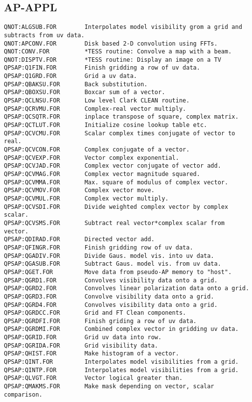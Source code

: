 \subsection{AP-APPL}
\begin{verbatim}
QNOT:ALGSUB.FOR        Interpolates model visibility grom a grid and subtracts from uv data.
QNOT:APCONV.FOR        Disk based 2-D convolution using FFTs.
QNOT:CONV.FOR          *TESS routine: Convolve a map with a beam.
QNOT:DISPTV.FOR        *TESS routine: Display an image on a TV
QPSAP:Q1FIN.FOR        Finish gridding a row of uv data.
QPSAP:Q1GRD.FOR        Grid a uv data.
QPSAP:QBAKSU.FOR       Back substitution.
QPSAP:QBOXSU.FOR       Boxcar sum of a vector.
QPSAP:QCLNSU.FOR       Low level Clark CLEAN routine.
QPSAP:QCRVMU.FOR       Complex-real vector multiply.
QPSAP:QCSQTR.FOR       inplace transpose of square, complex matrix.
QPSAP:QCTLUT.FOR       Initialize cosine lookup table etc.
QPSAP:QCVCMU.FOR       Scalar complex times conjugate of vector to real.
QPSAP:QCVCON.FOR       Complex conjugate of a vector.
QPSAP:QCVEXP.FOR       Vector complex exponential.
QPSAP:QCVJAD.FOR       Complex vector conjugate of vector add.
QPSAP:QCVMAG.FOR       Complex vector magnitude squared.
QPSAP:QCVMMA.FOR       Max. square of modulus of complex vector.
QPSAP:QCVMOV.FOR       Complex vector move.
QPSAP:QCVMUL.FOR       Complex vector multiply.
QPSAP:QCVSDI.FOR       Divide weighted complex vector by complex scalar.
QPSAP:QCVSMS.FOR       Subtract real vector*complex scalar from vector.
QPSAP:QDIRAD.FOR       Directed vector add.
QPSAP:QFINGR.FOR       Finish gridding row of uv data.
QPSAP:QGADIV.FOR       Divide Gaus. model vis. into uv data.
QPSAP:QGASUB.FOR       Subtract Gaus. model vis. from uv data.
QPSAP:QGET.FOR         Move data from pseudo-AP memory to "host".
QPSAP:QGRD1.FOR        Convolves visibility data onto a grid.
QPSAP:QGRD2.FOR        Convolves linear polarization data onto a grid.
QPSAP:QGRD3.FOR        Convolve visibility data onto a grid.
QPSAP:QGRD4.FOR        Convolves visibility data onto a grid.
QPSAP:QGRDCC.FOR       Grid and FT Clean components.
QPSAP:QGRDFI.FOR       Finish griding a row of uv data.
QPSAP:QGRDMI.FOR       Combined complex vector in gridding uv data.
QPSAP:QGRID.FOR        Grid uv data into row.
QPSAP:QGRIDA.FOR       Grid visibility data.
QPSAP:QHIST.FOR        Make histogram of a vector.
QPSAP:QINT.FOR         Interpolates model visibilities from a grid.
QPSAP:QINTP.FOR        Interpolates model visibilities from a grid.
QPSAP:QLVGT.FOR        Vector logical greater than.
QPSAP:QMAKMS.FOR       Make mask depending on vector, scalar comparison.

\end{verbatim}
